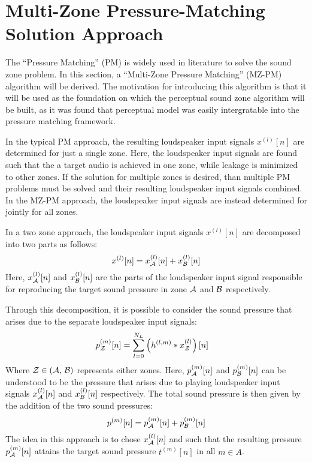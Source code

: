 \section{Multi-Zone Pressure-Matching Solution Approach}
\label{sec:sound_zones:pressure_matching}
The ``Pressure Matching'' (PM) is widely used in literature to solve the sound zone problem.
In this section, a ``Multi-Zone Pressure Matching'' (MZ-PM) algorithm will be derived.
The motivation for introducing this algorithm is that it will be used as the foundation on which the perceptual sound zone algorithm will be built, 
as it was found that perceptual model was easily intergratable into the pressure matching framework.

In the typical PM approach, the resulting loudspeaker input signals $x^{(l)}[n]$ are determined for just a single zone.
Here, the loudspeaker input signals are found such that the a target audio is achieved in one zone, while leakage is minimized to other zones.
If the solution for multiple zones is desired, than multiple PM problems must be solved and their resulting loudspeaker input signals combined. 
In the MZ-PM approach, the loudspeaker input signals are instead determined for jointly for all zones.

In a two zone approach, the loudspeaker input signals $x^{(l)}[n]$ are decomposed into two parts as follows:
\begin{equation}
    x^{(l)}[n] = x_{\mathcal{A}}^{(l)}[n] + x_{\mathcal{B}}^{(l)}[n]
\end{equation}
Here, $x_{\mathcal{A}}^{(l)}[n]$ and $x_{\mathcal{B}}^{(l)}[n]$ are the parts of the loudspeaker input signal responsible for reproducing the target sound pressure 
in zone $\mathcal{A}$ and $\mathcal{B}$ respectively.

Through this decomposition, it is possible to consider the sound pressure that arises due to the separate loudspeaker input signals:
\begin{align}
    p_{\mathcal{Z}}^{(m)}[n] &= \sum_{l=0}^{N_L} \left(h^{(l,m)} \ast x_{\mathcal{Z}}^{(l)}\right)[n] 
\end{align}
Where $\mathcal{Z} \in \left(\mathcal{A},\,\mathcal{B}\right)$ represents either zones.
Here, $p_{\mathcal{A}}^{(m)}[n]$ and $p_{\mathcal{B}}^{(m)}[n]$ can be understood to be the pressure that arises due to 
playing loudspeaker input signals $x_{\mathcal{A}}^{(l)}[n]$ and $x_{\mathcal{B}}^{(l)}[n]$ respectively. 
The total sound pressure is then given by the addition of the two sound pressures:
\begin{equation}
    p^{(m)}[n] = p_{\mathcal{A}}^{(m)}[n] + p_{\mathcal{B}}^{(m)}[n]
\end{equation}
The idea in this approach is to chose $x_{\mathcal{A}}^{(l)}[n]$ and such that the resulting pressure $p_{\mathcal{A}}^{(m)}[n]$ attains the target sound pressure $t^{(m)}[n]$ in all $m \in A$.   

